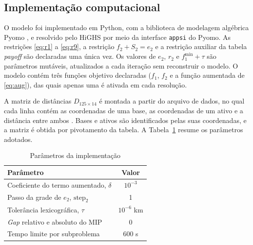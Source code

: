 \documentclass[conference]{IEEEtran}
\begin{document}
\subsection{Implementação computacional}

O modelo foi implementado em Python, com a biblioteca de modelagem algébrica Pyomo \cite{bynum2021}, e resolvido pelo HiGHS \cite{highs} por meio da interface \texttt{appsi} do Pyomo. As restrições \eqref{eq:r1} a \eqref{eq:r9}, a restrição $f_2 + S_2 = e_2$ e a restrição auxiliar da tabela \textit{payoff} são declaradas uma única vez. Os valores de $e_2$, $r_2$ e $f_1^{\min} + \tau$ são parâmetros mutáveis, atualizados a cada iteração sem reconstruir o modelo. O modelo contém três funções objetivo declaradas ($f_1$, $f_2$ e a função aumentada de \eqref{eq:aug}), das quais apenas uma é ativada em cada resolução.

A matriz de distâncias $D_{125\times14}$ é montada a partir do arquivo de dados, no qual cada linha contém as coordenadas de uma base, as coordenadas de um ativo e a distância entre ambos \cite{batista_tc}. Bases e ativos são identificados pelas suas coordenadas, e a matriz é obtida por pivotamento da tabela. A Tabela~\ref{tab:param} resume os parâmetros adotados.

\begin{table}[!t]
\renewcommand{\arraystretch}{1.2}
\caption{Parâmetros da implementação}
\label{tab:param}
\centering
\begin{tabular}{lc}
\hline
Parâmetro & Valor\\
\hline
Coeficiente do termo aumentado, $\delta$ & $10^{-3}$\\
Passo da grade de $e_2$, $\text{step}_2$ & 1\\
Tolerância lexicográfica, $\tau$ & $10^{-6}$ km\\
\textit{Gap} relativo e absoluto do MIP & 0\\
Tempo limite por subproblema & 600 s\\
\hline
\end{tabular}
\end{table}

\end{document}
